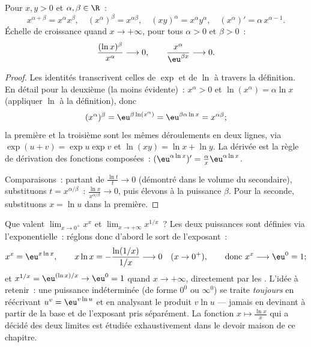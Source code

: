 \begin{proposition}\label{prop:b1:functions:powerrules}
Pour $x, y > 0$ et $\alpha, \beta \in \R$~:
\[
x^{\alpha+\beta} = x^\alpha x^\beta, \quad
(x^\alpha)^\beta = x^{\alpha\beta}, \quad
(xy)^\alpha = x^\alpha y^\alpha, \quad
(x^\alpha)' = \alpha\, x^{\alpha - 1}.
\]
Échelle de croissance quand $x \to
+\infty$, pour tous $\alpha > 0$ et $\beta > 0$~:
\[
\frac{(\ln x)^\beta}{x^\alpha} \longrightarrow 0,
\qquad
\frac{x^\alpha}{\eu^{\beta x}} \longrightarrow 0 .
\]
\end{proposition}

\begin{proof}
Les identités transcrivent celles de $\exp$ et de $\ln$ à travers la
définition. En détail pour la deuxième (la moins évidente)~: $x^\alpha
> 0$ et $\ln(x^\alpha) = \alpha\ln x$ (appliquer $\ln$ à la
définition), donc
\[
(x^\alpha)^\beta = \eu^{\beta\ln(x^\alpha)}
= \eu^{\beta\alpha\ln x} = x^{\alpha\beta} ;
\]
la première et la troisième sont les mêmes déroulements en deux
lignes, via $\exp(u + v) = \exp u\exp v$ et $\ln(xy) = \ln x + \ln y$.
La dérivée est la règle de dérivation des fonctions composées~:
$(\eu^{\alpha\ln x})' = \frac{\alpha}{x} \eu^{\alpha\ln x}$.

Comparaisons~: partant de $\frac{\ln t}{t} \to 0$ (démontré dans le
volume du secondaire), substituons $t = x^{\alpha/\beta}$~:
$\frac{\ln x}{x^{\alpha/\beta}} \to 0$, puis élevons à la puissance
$\beta$. Pour la seconde, substituons $x = \ln u$ dans la première.
\end{proof}

\begin{example}\label{ex:b1:functions:xx}
Que valent $\lim_{x \to 0^+} x^x$ et $\lim_{x \to +\infty}
x^{1/x}$~? Les deux puissances sont définies via l'exponentielle~:
réglons donc d'abord le sort de l'exposant~:
\[
x^x = \eu^{x\ln x}, \qquad
x\ln x = -\frac{\ln(1/x)}{1/x} \longrightarrow 0
\quad (x \to 0^+),
\qquad\text{donc } x^x \longrightarrow \eu^0 = 1 ;
\]
et $x^{1/x} = \eu^{(\ln x)/x} \to \eu^0 = 1$ quand $x \to +\infty$,
directement par les . L'idée à retenir~: une
puissance indéterminée (de forme $0^0$ ou $\infty^0$) se traite
\emph{toujours} en réécrivant $u^v = \eu^{v\ln u}$ et en analysant le
produit $v \ln u$ --- jamais en devinant à partir de la base et de
l'exposant pris séparément. La fonction $x \mapsto \frac{\ln x}{x}$
qui a décidé des deux limites est étudiée exhaustivement dans le
devoir maison de ce chapitre.
\end{example}

